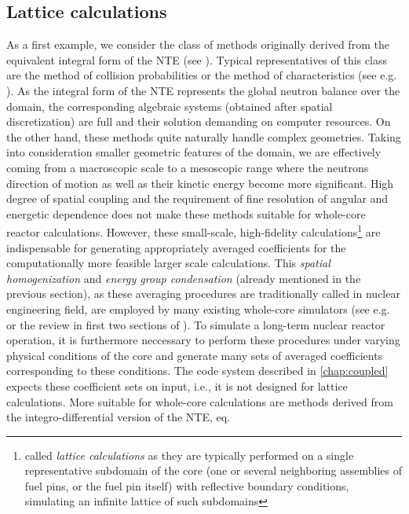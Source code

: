 \subsection{Lattice calculations} \label{sec:lattice}
As a first example, we consider the class of
methods originally derived from the equivalent integral form of the NTE (see ). Typical
representatives of this class are the method of collision probabilities or the method of characteristics (see e.g.
\cite{Cho2,Wu1,Hursin1,Petkov1,Sanchez1}). As the integral form of the NTE represents the global neutron balance over
the domain, the corresponding algebraic systems (obtained after spatial discretization) are full and
their solution demanding on computer resources. On the other hand, these methods quite naturally handle complex
geometries. Taking into consideration smaller geometric features of the domain, we are effectively coming from a
macroscopic scale to a mesoscopic range where the neutrons direction of motion as well as their kinetic energy become
more significant. High degree of spatial coupling and the requirement of fine resolution of angular and energetic
dependence does not make these methods suitable for whole-core reactor calculations.
However, these small-scale,
high-fidelity calculations\footnote{called \textit{lattice calculations} as they are typically performed on a single
representative subdomain of the core (one or several neighboring assemblies of fuel pins, or the fuel pin itself)
with reflective boundary conditions, simulating an infinite lattice of such subdomains} are indispensable for
generating appropriately averaged coefficients for the computationally more feasible larger scale calculations.
This \textit{spatial homogenization} and \textit{energy group condensation} (already mentioned in the previous
section), as these averaging procedures are traditionally called in nuclear engineering field, are employed by many existing whole-core simulators (see e.g.
\cite[Chap. 17]{Reuss1} or the review in first two sections of \cite{Sanchez7}). To simulate a long-term nuclear reactor
operation, it is furthermore neccessary to perform these procedures under varying physical conditions of the core and
generate many sets of averaged coefficients corresponding to these conditions. The code system described in
\cref{chap:coupled} expects these coefficient sets on input, i.e., it is not designed for lattice calculations.
\vspace*{1em}
More suitable for whole-core calculations are methods derived from the integro-differential
version of the NTE, eq.
